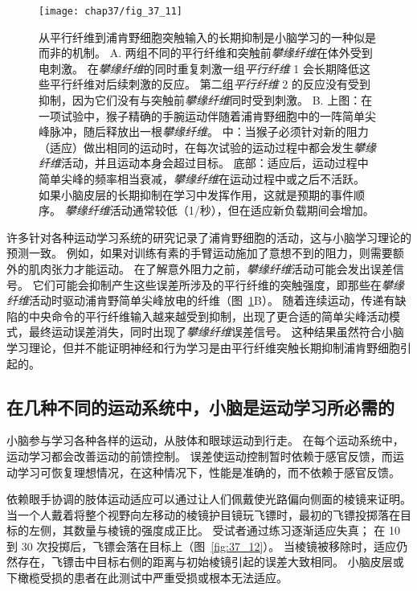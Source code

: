\begin{figure}[htbp]
	\centering
	\texttt{[image: chap37/fig\_37\_11]}
	\caption{从平行纤维到浦肯野细胞突触输入的长期抑制是小脑学习的一种似是而非的机制。
		A. 两组不同的平行纤维和突触前\textit{攀缘纤维}在体外受到电刺激。
		在\textit{攀缘纤维}的同时重复刺激一组\textit{平行纤维} 1 会长期降低这些平行纤维对后续刺激的反应。
		第二组\textit{平行纤维} 2 的反应没有受到抑制，因为它们没有与突触前\textit{攀缘纤维}同时受到刺激\cite{ito1982climbing}。
		B. 上图：在一项试验中，猴子精确的手腕运动伴随着浦肯野细胞中的一阵简单尖峰脉冲，随后释放出一根\textit{攀缘纤维}。
		中：当猴子必须针对新的阻力（适应）做出相同的运动时，在每次试验的运动过程中都会发生\textit{攀缘纤维}活动，并且运动本身会超过目标。
		底部：适应后，运动过程中简单尖峰的频率相当衰减，\textit{攀缘纤维}在运动过程中或之后不活跃。
		如果小脑皮层的长期抑制在学习中发挥作用，这就是预期的事件顺序。
		\textit{攀缘纤维}活动通常较低（1/秒），但在适应新负载期间会增加\cite{gilbert1977purkinje}。}
	\label{fig:37_11}
\end{figure}


许多针对各种运动学习系统的研究记录了浦肯野细胞的活动，这与小脑学习理论的预测一致。
例如，如果对训练有素的手臂运动施加了意想不到的阻力，则需要额外的肌肉张力才能运动。
在了解意外阻力之前，\textit{攀缘纤维}活动可能会发出误差信号。
它们可能会抑制产生这些误差所涉及的平行纤维的突触强度，即那些在\textit{攀缘纤维}活动时驱动浦肯野简单尖峰放电的纤维（图~\ref{fig:37_11}B）。
随着连续运动，传递有缺陷的中央命令的平行纤维输入越来越受到抑制，出现了更合适的简单尖峰活动模式，最终运动误差消失，同时出现了\textit{攀缘纤维}误差信号。
这种结果虽然符合小脑学习理论，但并不能证明神经和行为学习是由平行纤维突触长期抑制浦肯野细胞引起的。



\subsection{在几种不同的运动系统中，小脑是运动学习所必需的}

小脑参与学习各种各样的运动，从肢体和眼球运动到行走。
在每个运动系统中，运动学习都会改善运动的前馈控制。
误差使运动控制暂时依赖于感官反馈，而运动学习可恢复理想情况，在这种情况下，性能是准确的，而不依赖于感官反馈。


依赖眼手协调的肢体运动适应可以通过让人们佩戴使光路偏向侧面的棱镜来证明。
当一个人戴着将整个视野向左移动的棱镜护目镜玩飞镖时，最初的飞镖投掷落在目标的左侧，其数量与棱镜的强度成正比。
受试者通过练习逐渐适应失真；
在 10 到 30 次投掷后，飞镖会落在目标上（图~\ref{fig:37_12}）。
当棱镜被移除时，适应仍然存在，飞镖击中目标右侧的距离与初始棱镜引起的误差大致相同。
小脑皮层或下橄榄受损的患者在此测试中严重受损或根本无法适应。


